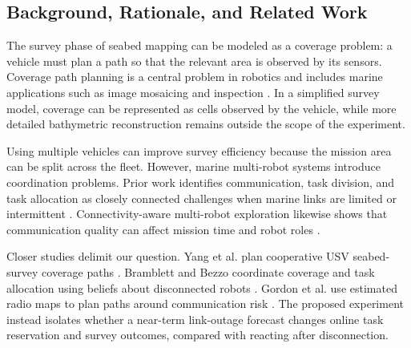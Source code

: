 \subsection{Background, Rationale, and Related Work}

The survey phase of seabed mapping can be modeled as a coverage problem: a vehicle must plan a path so that the relevant area is observed by its sensors. Coverage path planning is a central problem in robotics and includes marine applications such as image mosaicing and inspection \cite{galceran2013coverage}. In a simplified survey model, coverage can be represented as cells observed by the vehicle, while more detailed bathymetric reconstruction remains outside the scope of the experiment.

Using multiple vehicles can improve survey efficiency because the mission area can be split across the fleet. However, marine multi-robot systems introduce coordination problems. Prior work identifies communication, task division, and task allocation as closely connected challenges when marine links are limited or intermittent \cite{martorell2024coordination}. Connectivity-aware multi-robot exploration likewise shows that communication quality can affect mission time and robot roles \cite{abuaisheh2022cara}.

Closer studies delimit our question. Yang et al. plan cooperative USV seabed-survey coverage paths \cite{yang2023cooperative}. Bramblett and Bezzo coordinate coverage and task allocation using beliefs about disconnected robots \cite{bramblett2023epistemic}. Gordon et al. use estimated radio maps to plan paths around communication risk \cite{gordon2026communication}. The proposed experiment instead isolates whether a near-term link-outage forecast changes online task reservation and survey outcomes, compared with reacting after disconnection.

